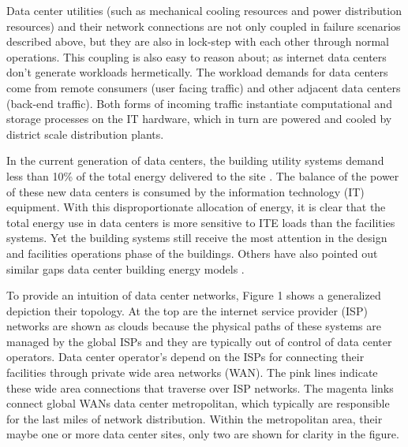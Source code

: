 Data center utilities (such as mechanical cooling resources and power distribution resources) and their network connections are not only coupled in failure scenarios described above, but they are also in lock-step with each other through normal operations. This coupling is also easy to reason about; as internet data centers don’t generate workloads hermetically. The workload demands for data centers come from remote consumers (user facing traffic) and other adjacent data centers (back-end traffic). Both forms of incoming traffic instantiate computational and storage processes on the IT hardware, which in turn are powered and cooled by district scale distribution plants.

In the current generation of data centers, the building utility systems demand less than 10\% of the total energy delivered to the site \cite{Shehabi16}. The balance of the power of these new data centers is consumed by the information technology (IT) equipment. With this disproportionate allocation of energy, it is clear that the total energy use in data centers is more sensitive to ITE loads than the facilities systems. Yet the building systems still receive the most attention in the design and facilities operations phase of the buildings. Others have also pointed out similar gaps data center building energy models \cite{Beatty15}. 

To provide an intuition of data center networks, Figure 1 shows a generalized depiction their topology. At the top are the internet service provider (ISP) networks are shown as clouds because the physical paths of these systems are managed by the global ISPs and they are typically out of control of data center operators. Data center operator’s depend on the ISPs for connecting their facilities through private wide area networks (WAN). The pink lines indicate these wide area connections that traverse over ISP networks. The magenta links connect global WANs data center metropolitan, which typically are responsible for the last miles of network distribution. Within the metropolitan area, their maybe one or more data center sites, only two are shown for clarity in the figure.  